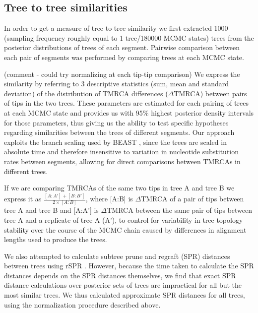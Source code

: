 \documentclass[11pt,oneside,letterpaper]{article}
\begin{document}
\subsection*{Tree to tree similarities}
In order to get a measure of tree to tree similarity we first extracted 1000 (sampling frequency roughly equal to 1 tree/180000 MCMC states) trees from the posterior distributions of trees of each segment.
Pairwise comparison between each pair of segments was performed by comparing trees at each MCMC state.

(comment - could try normalizing at each tip-tip comparison)
We express the similarity by referring to 3 descriptive statistics (sum, mean and standard deviation) of the distribution of TMRCA differences ($\Delta$TMRCA) between pairs of tips in the two trees.
These parameters are estimated for each pairing of trees at each MCMC state and provides us with 95\% highest posterior density intervals for those parameters, thus giving us the ability to test specific hypotheses regarding similarities between the trees of different segments.
Our approach exploits the branch scaling used by BEAST \cite{drummond2012}, since the trees are scaled in absolute time and therefore insensitive to variation in nucleotide substitution rates between segments, allowing for direct comparisons between TMRCAs in different trees.

If we are comparing TMRCAs of the same two tips in tree A and tree B we express it as $\frac{[A:A']+[B:B']}{2\times [A:B]}$, where [A:B] is $\Delta$TMRCA of a pair of tips between tree A and tree B and [A:A'] is $\Delta$TMRCA between the same pair of tips between tree A and a replicate of tree A (A'), to control for variability in tree topology stability over the course of the MCMC chain caused by differences in alignment lengths used to produce the trees.

We also attempted to calculate subtree prune and regraft (SPR) distances between trees using rSPR \cite{whidden2009,whidden2010,whidden2013}.
However, because the time taken to calculate the SPR distances depends on the SPR distances themselves, we find that exact SPR distance calculations over posterior sets of trees are impractical for all but the most similar trees.
We thus calculated approximate SPR distances for all trees, using the normalization procedure described above.
\end{document}
